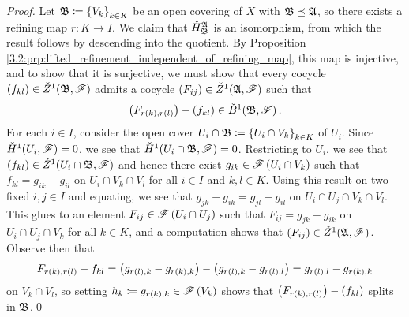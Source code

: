 \documentclass[../Moduli_Spaces_of_Riemann_Surfaces.tex]{subfiles}
\begin{document}
    \begin{proof}
        Let $\mathfrak{B}\coloneqq\left\{V_k\right\}_{k\in K}$ be an open covering of $X$ with $\mathfrak{B}\preceq\mathfrak{A}$, so there exists a refining map $r:K\to I$. We claim that $\check{H}^{\mathfrak{A}}_{\mathfrak{B}}$ is an isomorphism, from which the result follows by descending into the quotient. By Proposition \ref{3.2:prp:lifted_refinement_independent_of_refining_map}, this map is injective, and to show that it is surjective, we must show that every cocycle $\left(f_{kl}\right)\in\check{Z}^1\!\left(\mathfrak{B},\mathscr{F}\right)$ admits a cocycle $\left(F_{ij}\right)\in\check{Z}^1\!\left(\mathfrak{A},\mathscr{F}\right)$ such that
        \begin{equation*}
            \left(F_{r\left(k\right),r\left(l\right)}\right)-\left(f_{kl}\right)\in\check{B}^1\!\left(\mathfrak{B},\mathscr{F}\right).
        \end{equation*}
        For each $i\in I$, consider the open cover $U_i\cap\mathfrak{B}\coloneqq\left\{U_i\cap V_k\right\}_{k\in K}$ of $U_i$. Since $\check{H}^1\!\left(U_i,\mathscr{F}\right)=0$, we see that $\check{H}^1\!\left(U_i\cap\mathfrak{B},\mathscr{F}\right)=0$. Restricting to $U_i$, we see that $\left(f_{kl}\right)\in\check{Z}^1\!\left(U_i\cap\mathfrak{B},\mathscr{F}\right)$ and hence there exist $g_{ik}\in\mathscr{F}\left(U_i\cap V_k\right)$ such that $f_{kl}=g_{ik}-g_{il}$ on $U_i\cap V_k\cap V_l$ for all $i\in I$ and $k,l\in K$. Using this result on two fixed $i,j\in I$ and equating, we see that $g_{jk}-g_{ik}=g_{jl}-g_{il}$ on $U_i\cap U_j\cap V_k\cap V_l$. This glues to an element $F_{ij}\in\mathscr{F}\left(U_i\cap U_j\right)$ such that $F_{ij}=g_{jk}-g_{ik}$ on $U_i\cap U_j\cap V_k$ for all $k\in K$, and a computation shows that $\left(F_{ij}\right)\in\check{Z}^1\!\left(\mathfrak{A},\mathscr{F}\right)$. Observe then that
        \begin{equation*}
            F_{r\left(k\right),r\left(l\right)}-f_{kl}=\left(g_{r\left(l\right),k}-g_{r\left(k\right),k}\right)-\left(g_{r\left(l\right),k}-g_{r\left(l\right),l}\right)=g_{r\left(l\right),l}-g_{r\left(k\right),k}
        \end{equation*}
        on $V_k\cap V_l$, so setting $h_k\coloneqq g_{r\left(k\right),k}\in\mathscr{F}\left(V_k\right)$ shows that $\left(F_{r\left(k\right),r\left(l\right)}\right)-\left(f_{kl}\right)$ splits in $\mathfrak{B}$.\qed
    \end{proof}
\end{document}

